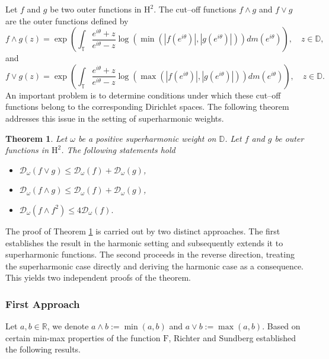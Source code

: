 \documentclass[12pt,reqno,a4paper]{amsart}
\newtheorem{theo}[prop]{Theorem}
\newcommand{\hH}{\mathrm{H^2 }}
\newcommand\TT{\mathbb{T}}
\newcommand\DD{\mathbb{D}}
\newcommand{\FF}{\mathrm{F}}
\newcommand{\cD}{{\mathcal{D}}}
\numberwithin{equation}{section}
\begin{document}
Let $f$ and $g$ be two outer functions in $\hH$. The cut--off functions $f\wedge g$ and $f\vee g$ are the outer functions defined by 
$$
f\wedge g(z)=\exp\left(\int_{\TT}\frac{e^{i\theta}+z}{e^{i\theta}-z}\log\left(\min(|f(e^{i\theta})|,|g(e^{i\theta})|)\right)dm(e^{i\theta})\right),\quad z\in\DD, 
$$
and 
$$
f\vee g(z)=\exp\left(\int_{\TT}\frac{e^{i\theta}+z}{e^{i\theta}-z}\log\left(\max(|f(e^{i\theta})|,|g(e^{i\theta})|)\right)dm(e^{i\theta})\right),\quad z\in\DD.
$$
An important problem is to determine conditions under which these cut--off functions belong to the corresponding Dirichlet spaces. The following theorem addresses this issue in the setting of superharmonic weights.
\begin{theo}\label{cut--off}
	Let \(\omega\) be a positive superharmonic weight on \(\DD\). Let \(f\) and \(g\) be outer functions in \(\hH\). The following statements hold
	\begin{itemize}
		\item[A.] $\mathcal{D}_\omega(f\vee g)\leq \cD_\omega(f)+\cD_\omega(g) $,
		\item[B.] $\cD_\omega(f\wedge g)\leq \cD_\omega(f)+\cD_\omega(g) $,
		\item[C.]$\cD_\omega(f\wedge f^2)\leq 4\cD_\omega(f).$
	\end{itemize}
\end{theo}
%
The proof of Theorem \ref{cut--off} is carried out by two distinct approaches. The first establishes the result in the harmonic setting and subsequently extends it to superharmonic functions. The second proceeds in the reverse direction, treating the superharmonic case directly and deriving the harmonic case as a consequence. This yields two independent proofs of the theorem.

\subsubsection{First Approach}
{Let \( a, b \in \mathbb{R} \), we denote} \( a \wedge b := \min(a, b) \) and \( a \vee b := \max(a, b) \). Based on certain min-max properties of the function \(\FF\), Richter and Sundberg established the following results.
\end{document}

